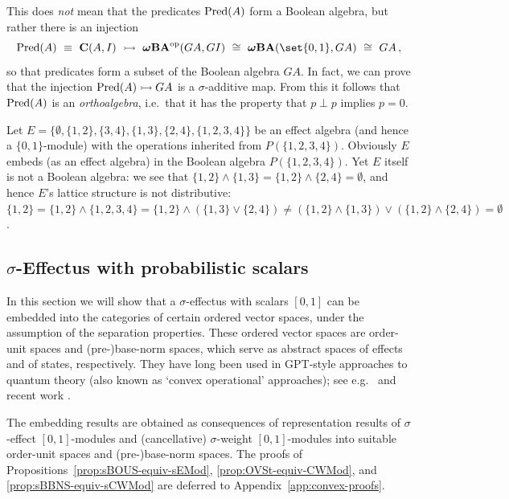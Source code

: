 \documentclass[%
	submission,
copyright,creativecommons,UKenglish]{eptcs}
\begin{document}
\noindent
This does \emph{not} mean that
the predicates $\mathrm{Pred}(A)$ form a Boolean algebra,
but rather there is an injection
\[
\Pred(A)
\ \equiv\ 
\catC(A,I)
\ \rightarrowtail \
\omegaBA^\opp(GA,GI)
\ \cong\ 
\omegaBA(\set{0,1},GA)
\ \cong\ 
GA
\mpunct,
\]
so that predicates form a subset of the Boolean algebra $GA$.
In fact, we can prove that
the injection $\mathrm{Pred}(A)\rightarrowtail GA$ is a $\sigma$-additive map.
From this it follows that $\mathrm{Pred}(A)$ is an \emph{orthoalgebra}, i.e.~that
it has the property that $p\perp p$ implies $p=0$.


\begin{Auxproof}
\begin{example}\label{ex:notBoolean}
    Let $E = \{\emptyset, \{1,2\}, \{3,4\}, \{1,3\}, \{2,4\}, \{1,2,3,4\}\}$ be an effect algebra (and hence a $\{0,1\}$-module) with the operations inherited from $P(\{1,2,3,4\})$. Obviously $E$ embeds (as an effect algebra) in the Boolean algebra $P(\{1,2,3,4\})$. Yet $E$ itself is not a Boolean algebra: we see that $\{1,2\} \wedge \{1,3\} = \{1,2\} \wedge \{2,4\} = \emptyset$, and hence $E$'s lattice structure is not distributive: \\$\{1,2\} = \{1,2\} \wedge \{1,2,3,4\} = \{1,2\} \wedge (\{1,3\} \vee \{2,4\}) \neq (\{1,2\} \wedge \{1,3\}) \vee (\{1,2\} \wedge \{2,4\}) = \emptyset$.
\end{example}
\end{Auxproof}


\subsection{\texorpdfstring{$\sigma$}{sigma}-Effectus with probabilistic scalars}
\label{sec:OUS}

In this section we will show that
a $\sigma$-effectus with scalars
$[0,1]$ can be embedded into
the categories of certain ordered vector spaces,
under the assumption of the separation properties.
These ordered vector spaces are
order-unit spaces and (pre-)base-norm spaces,
which serve as abstract spaces of effects and of states,
respectively.
They have long been used in
GPT-style approaches to quantum theory
(also known as `convex operational' approaches);
see e.g.\ \cite{Ludwig1983,Ludwig1985,
DaviesL1970,Edwards1970}
and recent work
\cite{BarnumW2016,CassinelliL2016,Furber2017,Furber2018QPL}.

The embedding results are obtained as consequences of
representation results of
$\sigma$-effect $[0,1]$-modules and (cancellative)
$\sigma$-weight $[0,1]$-modules
into suitable order-unit spaces and (pre-)base-norm spaces.
The proofs of
Propositions~\ref{prop:sBOUS-equiv-sEMod},
\ref{prop:OVSt-equiv-CWMod}, and \ref{prop:sBBNS-equiv-sCWMod}
are deferred to Appendix~\ref{app:convex-proofs}.
\end{document}
